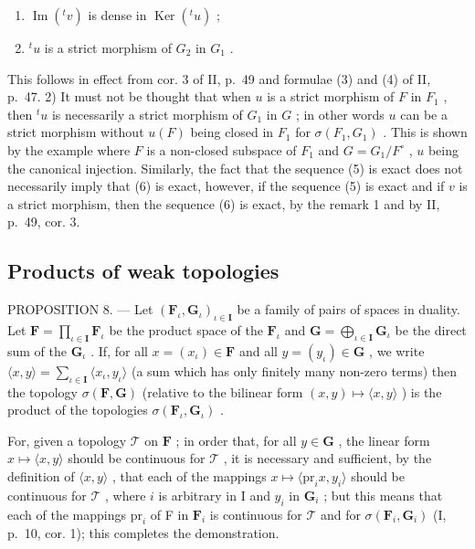 \begin{enumerate}
\def\labelenumi{\alph{enumi})}
\setcounter{enumi}{1}
\item
  \(\operatorname{Im}(^{t}v)\) is dense in \(\operatorname{Ker}(^{t}u)\) ;
\item
  \(^t u\) is a strict morphism of \(G_2\) in \(G_1\) .
\end{enumerate}

This follows in effect from cor. 3 of II, p.~49 and formulae (3) and (4) of II, p.~47. 2) It must not be thought that when \(u\) is a strict morphism of \(F\) in \(F_1\) , then \(^t u\) is necessarily a strict morphism of \(G_1\) in \(G\) ; in other words \(u\) can be a strict morphism without \(u(F)\) being closed in \(F_1\) for \(\sigma(F_1, G_1)\) . This is shown by the example where \(F\) is a non-closed subspace of \(F_1\) and \(G = G_1 / F^\circ\) , \(u\) being the canonical injection. Similarly, the fact that the sequence (5) is exact does not necessarily imply that (6) is exact, however, if the sequence (5) is exact and if \(v\) is a strict morphism, then the sequence (6) is exact, by the remark 1 and by II, p.~49, cor. 3.

\subsection{Products of weak topologies}

PROPOSITION 8. --- Let \((\mathbf{F}_{\iota}, \mathbf{G}_{\iota})_{\iota \in \mathbf{I}}\) be a family of pairs of spaces in duality. Let \(\mathbf{F} = \prod_{\iota \in \mathbf{I}} \mathbf{F}_{\iota}\) be the product space of the \(\mathbf{F}_{\iota}\) and \(\mathbf{G} = \bigoplus_{\iota \in \mathbf{I}} \mathbf{G}_{\iota}\) be the direct sum of the \(\mathbf{G}_{\iota}\) . If, for all \(x = (x_{\iota}) \in \mathbf{F}\) and all \(y = (y_{\iota}) \in \mathbf{G}\) , we write \(\langle x, y \rangle = \sum_{\iota \in \mathbf{I}} \langle x_{\iota}, y_{\iota} \rangle\) (a sum which has only finitely many non-zero terms) then the topology \(\sigma(\mathbf{F}, \mathbf{G})\) (relative to the bilinear form \((x, y) \mapsto \langle x, y \rangle\) ) is the product of the topologies \(\sigma(\mathbf{F}_{\iota}, \mathbf{G}_{\iota})\) .

For, given a topology \(\mathcal{T}\) on \(\mathbf{F}\) ; in order that, for all \(y \in \mathbf{G}\) , the linear form \(x \mapsto \langle x, y \rangle\) should be continuous for \(\mathcal{T}\) , it is necessary and sufficient, by the definition of \(\langle x, y \rangle\) , that each of the mappings \(x \mapsto \langle \mathrm{pr}_i x, y_i \rangle\) should be continuous for \(\mathcal{T}\) , where \(i\) is arbitrary in I and \(y_i\) in \(\mathbf{G}_i\) ; but this means that each of the mappings \(\mathrm{pr}_i\) of F in \(\mathbf{F}_i\) is continuous for \(\mathcal{T}\) and for \(\sigma(\mathbf{F}_i, \mathbf{G}_i)\) (I, p.~10, cor. 1); this completes the demonstration.

